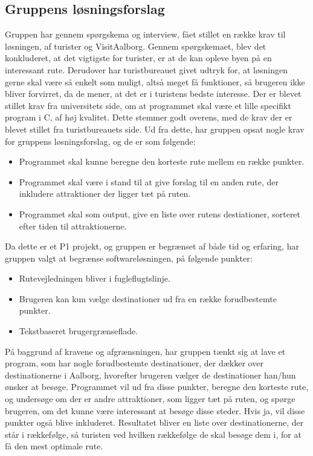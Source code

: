 \subsection{Gruppens løsningsforslag}
Gruppen har gennem spørgskema og interview, fået stillet en række krav til løsningen, af turister og VisitAalborg. 
Gennem spørgskemaet, blev det konkluderet, at det vigtigste for turister, er at de kan opleve byen på en interessant rute. 
Derudover har turistbureauet givet udtryk for, at løsningen gerne skal være så enkelt som muligt, altså meget få funktioner, så brugeren ikke bliver forvirret, da de mener, at det er i turistens bedste interesse. \newline
Der er blevet stillet krav fra universitets side, om at programmet skal være et lille specifikt program i C, af høj kvalitet. Dette stemmer godt overens, med de krav der er blevet stillet fra turistbureauets side.   \newline
Ud fra dette, har gruppen opsat nogle krav for gruppens løsningsforslag, og de er som følgende:
\begin{itemize}
	\item Programmet skal kunne beregne den korteste rute mellem en række punkter.
	\item Programmet skal være i stand til at give forslag til en anden rute, der inkludere attraktioner der ligger tæt på ruten.
 	\item Programmet skal som output, give en liste over rutens destiationer, sorteret efter tiden til attraktionerne.
\end{itemize}

Da dette er et P1 projekt, og gruppen er begrænset af både tid og erfaring, har gruppen valgt at begrænse softwareløsningen, på følgende punkter: 
\begin{itemize}
	\item Rutevejledningen bliver i fugleflugtslinje.
	\item Brugeren kan kun vælge destinationer ud fra en række forudbestemte punkter.
	\item Tekstbaseret brugergrænseflade.
\end{itemize}

På baggrund af kravene og afgrænsningen, har gruppen tænkt sig at lave et program, som har nogle forudbestemte destinationer, der dækker over destinationerne i Aalborg, hvorefter brugeren vælger de destinationer han/hun ønsker at besøge. Programmet vil ud fra disse punkter, beregne den korteste rute, og undersøge om der er andre attraktioner, som ligger tæt på ruten, og spørge brugeren, om det kunne være interessant at besøge disse steder. Hvis ja, vil disse punkter også blive inkluderet. Resultatet bliver en liste over destinationerne, der står i rækkefølge, så turisten ved hvilken rækkefølge de skal besøge dem i, for at få den mest optimale rute.
